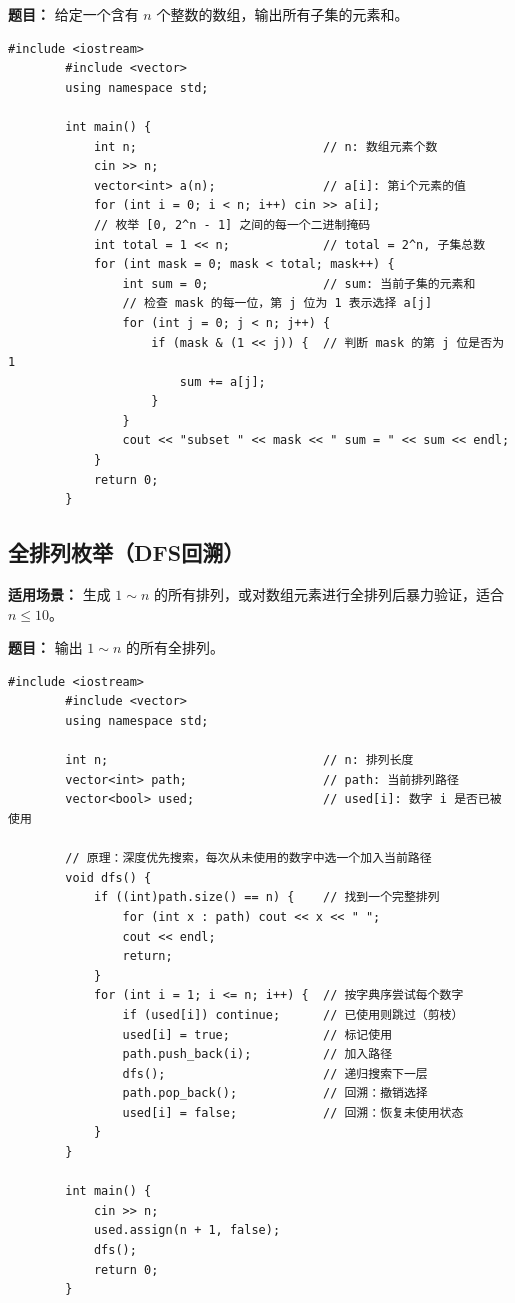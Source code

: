 \documentclass[12pt,a4paper]{ctexart}
\begin{document}
	\textbf{题目：} 给定一个含有 \(n\) 个整数的数组，输出所有子集的元素和。
	
	\begin{lstlisting}[caption={二进制枚举所有子集}]
		#include <iostream>
		#include <vector>
		using namespace std;
		
		int main() {
			int n;                          // n: 数组元素个数
			cin >> n;
			vector<int> a(n);               // a[i]: 第i个元素的值
			for (int i = 0; i < n; i++) cin >> a[i];
			// 枚举 [0, 2^n - 1] 之间的每一个二进制掩码
			int total = 1 << n;             // total = 2^n, 子集总数
			for (int mask = 0; mask < total; mask++) {
				int sum = 0;                // sum: 当前子集的元素和
				// 检查 mask 的每一位，第 j 位为 1 表示选择 a[j]
				for (int j = 0; j < n; j++) {
					if (mask & (1 << j)) {  // 判断 mask 的第 j 位是否为 1
						sum += a[j];
					}
				}
				cout << "subset " << mask << " sum = " << sum << endl;
			}
			return 0;
		}
	\end{lstlisting}
	
	\subsection{全排列枚举（DFS回溯）}
	\textbf{适用场景：} 生成 \(1 \sim n\) 的所有排列，或对数组元素进行全排列后暴力验证，适合 \(n \le 10\)。
	
	\textbf{题目：} 输出 \(1 \sim n\) 的所有全排列。
	
	\begin{lstlisting}[caption={DFS回溯生成全排列}]
		#include <iostream>
		#include <vector>
		using namespace std;
		
		int n;                              // n: 排列长度
		vector<int> path;                   // path: 当前排列路径
		vector<bool> used;                  // used[i]: 数字 i 是否已被使用
		
		// 原理：深度优先搜索，每次从未使用的数字中选一个加入当前路径
		void dfs() {
			if ((int)path.size() == n) {    // 找到一个完整排列
				for (int x : path) cout << x << " ";
				cout << endl;
				return;
			}
			for (int i = 1; i <= n; i++) {  // 按字典序尝试每个数字
				if (used[i]) continue;      // 已使用则跳过（剪枝）
				used[i] = true;             // 标记使用
				path.push_back(i);          // 加入路径
				dfs();                      // 递归搜索下一层
				path.pop_back();            // 回溯：撤销选择
				used[i] = false;            // 回溯：恢复未使用状态
			}
		}
		
		int main() {
			cin >> n;
			used.assign(n + 1, false);
			dfs();
			return 0;
		}
	\end{lstlisting}
	
\end{document}
